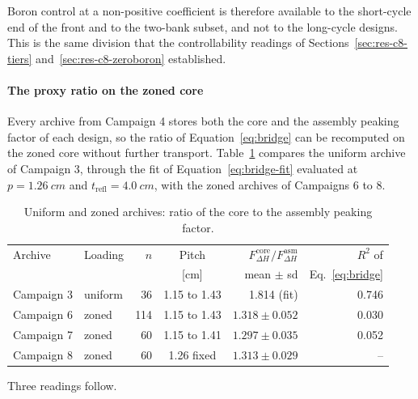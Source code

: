Boron control at a non-positive coefficient is therefore available to
the short-cycle end of the front and to the two-bank subset, and not
to the long-cycle designs. This is the same division that the
controllability readings of Sections~\ref{sec:res-c8-tiers}
and~\ref{sec:res-c8-zeroboron} established.

\paragraph{The proxy ratio on the zoned core}
\label{sec:res-proxy-gap-zoned}

Every archive from Campaign 4 stores both the core and the assembly
peaking factor of each design, so the ratio of
Equation~\eqref{eq:bridge} can be recomputed on the zoned core without
further transport. Table~\ref{tab:proxy-gap-zoned} compares the uniform
archive of Campaign 3, through the fit of
Equation~\eqref{eq:bridge-fit} evaluated at $p = \SI{1.26}{cm}$ and
$t_\mathrm{refl} = \SI{4.0}{cm}$, with the zoned archives of Campaigns
6 to 8.

\begin{table}[htbp]
  \centering
  \small
  \caption{Uniform and zoned archives: ratio of the core to the assembly peaking factor.}
  \label{tab:proxy-gap-zoned}
  \begin{tabular}{@{}llrcrr@{}}
    \toprule
    Archive & Loading & $n$ & Pitch & $F_{\Delta H}^\mathrm{core}/F_{\Delta H}^\mathrm{asm}$ & $R^2$ of \\
     &  &  & [cm] & mean $\pm$ sd & Eq.~\eqref{eq:bridge} \\
    \midrule
    Campaign 3 & uniform & 36  & 1.15 to 1.43 & 1.814 (fit) & 0.746 \\
    Campaign 6 & zoned   & 114 & 1.15 to 1.43 & $1.318 \pm 0.052$ & 0.030 \\
    Campaign 7 & zoned   & 60  & 1.15 to 1.41 & $1.297 \pm 0.035$ & 0.052 \\
    Campaign 8 & zoned   & 60  & 1.26 fixed   & $1.313 \pm 0.029$ & -- \\
    \bottomrule
  \end{tabular}
\end{table}

Three readings follow.

